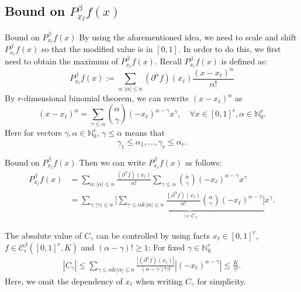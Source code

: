 \documentclass{if-beamer}
\begin{document}
\subsection{Bound on $P^{\beta}_{x_{\ell}}f(x)$}
\begin{frame}{Bound on $P^{\beta}_{x_{\ell}}f(x)$}
    By using the aforementioned idea, we need to scale and shift $P^{\beta}_{x_{\ell}}f(x)$ so that the modified value is in $[0,1]$. In order to do this, we first need to obtain the maximum of $P^{\beta}_{x_{\ell}}f(x)$.
    Recall $P^{\beta}_{x_{\ell}}f(x)$ is defined as: 
     \begin{equation*}
        P_{x_{\ell}}^{\beta}f(x):=\sum_{\alpha:|\alpha|\leq n}(\partial^{\alpha}f)(x_{\ell})\frac{(x-x_{\ell})^{\alpha}}{\alpha!}
    \end{equation*}
    By $r$-dimensional binomial theorem, we can rewrite $(x-x_{\ell})^{\alpha}$ as 
    \begin{equation*}
        (x-x_{\ell})^{\alpha}=\sum_{\gamma \leq \alpha} {\alpha \choose \gamma} (-x_{\ell})^{\alpha-\gamma}x^{\gamma}, \quad
        \forall x \in [0,1]^{r}, \alpha \in \mathbb{N}_{0}^{r}.  
    \end{equation*}
    Here for vectors $\gamma,\alpha \in \mathbb{N}_{0}^{r}$, $\gamma \leq \alpha$ means that 
    \begin{equation*}
        \gamma_{1}\leq\alpha_{1},\dots,\gamma_{r}\leq\alpha_{r}.
    \end{equation*}
\end{frame}

\begin{frame}{Bound on $P^{\beta}_{x_{\ell}}f(x)$}
    Then we can write $P^{\beta}_{x_{\ell}}f(x)$ as follows:
    \begin{align*}
        P_{x_{\ell}}^{\beta}f(x)&=\sum_{\alpha:|\alpha|\leq n}\frac{(\partial^{\alpha}f)(x_{\ell})}{\alpha!}
        \sum_{\gamma \leq \alpha} {\alpha \choose \gamma} (-x_{\ell})^{\alpha-\gamma}x^{\gamma}\\
        &=\sum_{\gamma:|\gamma|\leq n}
        \underbrace{\Bigg[\sum_{\gamma \leq \alpha \& |\alpha| \leq n} \frac{(\partial^{\alpha}f)(x_{\ell})}{\alpha!}{\alpha \choose \gamma} (-x_{\ell})^{\alpha-\gamma}\Bigg]}_{:=C_{\gamma}}x^{\gamma}.
    \end{align*}
    
    The absolute value of $C_{\gamma}$ can be controlled by using facts $x_{\ell}\in[0,1]^{r}$, $f\in\mathcal{C}_{r}^{\beta}([0,1]^{r},K)$ and $(\alpha-\gamma)!\geq 1$:
    For fixed $\gamma\in \mathbb{N}_{0}^{r}$
    \begin{align*}
        \left|C_{\gamma}\right| \leq \sum_{\gamma \leq \alpha \& |\alpha| \leq n} \frac{|(\partial^{\alpha}f)(x_{\ell})|}{(\alpha-\gamma)!\gamma!}|(-x_{\ell})^{\alpha-\gamma}|
        \leq \frac{K}{\gamma!}.
    \end{align*}
    Here, we omit the dependency of $x_{\ell}$ when writing $C_{\gamma}$ for simplicity.
\end{frame}
\end{document}

